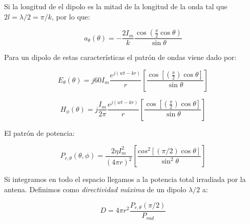 \documentclass[12pt]{article}
\newcommand{\parentesis}[1]{\left( #1  \right)}
\newcommand{\ccorchetes}[1]{\left[ #1  \right]}
\begin{document}
Si la longitud de el dipolo es la mitad de la longitud de la onda tal que $2l = \lambda / 2  = \pi/k$, por lo que:

\begin{equation}
a_{\theta} (\theta) = - \dfrac{2 I_m}{k} \dfrac{\cos (\frac{\pi}{2} \cos \theta)}{\sin \theta}
\end{equation}
 
Para un dipolo de estas características el patrón de ondas viene dado por:

\begin{equation}
E_\theta (\theta) = j 60 I_m \dfrac{e^{j(wt-kr)}}{r} \ccorchetes{\dfrac{\cos \ccorchetes{\parentesis{\frac{\pi}{2}} \cos \theta}}{\sin \theta}}
\end{equation}

\begin{equation}
H_\phi (\theta) = j  \dfrac{I_m}{2 \pi} \dfrac{e^{j(wt-kr)}}{r} \ccorchetes{\dfrac{\cos \ccorchetes{\parentesis{\frac{\pi}{2}} \cos \theta}}{\sin \theta}}
\end{equation}

El patrón de potencia:


\begin{equation}
P_{r,\theta} (\theta,\phi) = \dfrac{2 \eta I_m^2}{(4 \pi r)^2} \ccorchetes{\dfrac{cos^2 \ccorchetes{\parentesis{\pi/2} \cos \theta}}{\sin^2 \theta}}
\end{equation}
 
Si integramos en todo el espacio llegamos a la potencia total irradiada por la antena. Definimos como \textit{directividad máxima} de un dipolo $\lambda/2$ a:

\begin{equation}
D = 4 \pi r^2 \dfrac{P_{r,\theta} (\pi/2)}{P_{rad}}
\end{equation} 
 
 
\end{document}
